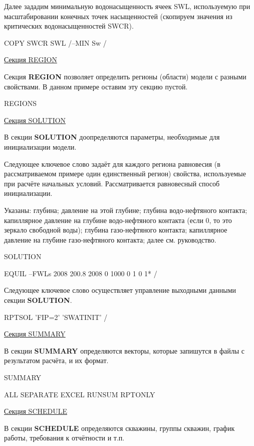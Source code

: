 Далее зададим минимальную водонасыщенность ячеек SWL, используемую при масштабировании конечных точек насыщенностей (скопируем значения из критических водонасыщенностей SWCR).
\begin{eclrun}
COPY
SWCR SWL /--MIN Sw
/
\end{eclrun}


\underline{Секция REGION}

Секция \textbf{REGION} позволяет определить регионы (области) модели с разными свойствами.
В данном примере оставим эту секцию пустой.
\begin{eclrun}
REGIONS
\end{eclrun}


\underline{Секция SOLUTION}

В секции \textbf{SOLUTION} доопределяются параметры, необходимые для инициализации модели.

Следующее ключевое слово задаёт для каждого региона равновесия (в рассматриваемом примере один единственный регион) свойства, используемые при расчёте начальных условий.
Рассматривается равновесный способ инициализации.

Указаны: глубина; давление на этой глубине; глубина водо-нефтяного контакта; капиллярное давление на глубине водо-нефтяного контакта (если 0, то это зеркало свободной воды); глубина газо-нефтяного контакта; капиллярное давление на глубине газо-нефтяного контакта; далее см. руководство.

\begin{eclrun}
SOLUTION

EQUIL
--FWLs
2008   200.8   2008   0   1000   0  1  0  1*  /
\end{eclrun}

Следующее ключевое слово осуществляет управление выходными данными секции \textbf{SOLUTION}.
\begin{eclrun}
RPTSOL
'FIP=2' 'SWATINIT' /
\end{eclrun}

\underline{Секция SUMMARY}

В секции \textbf{SUMMARY} определяются векторы, которые запишутся в файлы с результатом расчёта, и их формат.

\begin{eclrun}
SUMMARY

ALL
SEPARATE
EXCEL
RUNSUM
RPTONLY
\end{eclrun}

\underline{Секция SCHEDULE}

В секции \textbf{SCHEDULE} определяются скважины, группы скважин, график работы, требования к отчётности и т.п.

